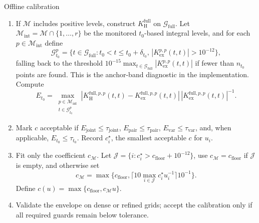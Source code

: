 \documentclass[11pt,a4paper]{article}
\theoremstyle{definition}
\theoremstyle{remark}
\begin{document}
\begin{tartarebox}{Offline calibration}
\begin{enumerate}[label=\textbf{O\arabic*.},leftmargin=1.8em,itemsep=4pt,topsep=2pt]
\[
E_{\mathrm{var}}=\max_j |K_{\mathrm H,jj}-K_{\mathrm{ex},jj}|\max\{|K_{\mathrm{ex},jj}|,\eta\}^{-1}.
\]
\item If \(\mathcal M\) includes positive levels, construct \(K_{\mathrm H}^{\mathrm{full}}\) on \(\mathcal G_{\mathrm{full}}\). Let \(\mathcal M_{\mathrm{int}}=\mathcal M\cap\{1,\ldots,r\}\) be the monitored \(t_0\)-based integral levels, and for each \(p\in\mathcal M_{\mathrm{int}}\) define
\[
\mathcal G_{t_0}^p=\{t\in\mathcal G_{\mathrm{full}}:t_0<t\leq t_0+\delta_{t_0},\, |K_{\mathrm{ex}}^{p,p}(t,t)|>10^{-12}\},
\]
falling back to the threshold \(10^{-15}\max_{t\in\mathcal G_{\mathrm{full}}}|K_{\mathrm{ex}}^{p,p}(t,t)|\) if fewer than \(n_{t_0}\) points are found. This is the anchor-band diagnostic in the implementation. Compute
\[
E_{t_0}=\max_{\substack{p\in\mathcal M_{\mathrm{int}}\\ t\in\mathcal G_{t_0}^p}} |K_{\mathrm H}^{\mathrm{full},p,p}(t,t)-K_{\mathrm{ex}}^{\mathrm{full},p,p}(t,t)|\,|K_{\mathrm{ex}}^{\mathrm{full},p,p}(t,t)|^{-1}.
\]
\item Mark \(c\) acceptable if \(E_{\mathrm{joint}}\leq\tau_{\mathrm{joint}}\), \(E_{\mathrm{pair}}\leq\tau_{\mathrm{pair}}\), \(E_{\mathrm{var}}\leq\tau_{\mathrm{var}}\), and, when applicable, \(E_{t_0}\leq\tau_{t_0}\). Record \(c_i^\star\), the smallest acceptable \(c\) for \(u_i\).
\item Fit only the coefficient \(c_{\mathcal M}\). Let \(\mathcal J=\{i:c_i^\star>c_{\mathrm{floor}}+10^{-12}\}\), use \(c_{\mathcal M}=c_{\mathrm{floor}}\) if \(\mathcal J\) is empty, and otherwise set
\[
c_{\mathcal M}=\max\{c_{\mathrm{floor}},\lceil10\max_{i\in\mathcal J}c_i^\star u_i^{-1}\rceil10^{-1}\}.
\]
Define \(c(u)=\max\{c_{\mathrm{floor}},c_{\mathcal M}u\}\).
\item Validate the envelope on dense or refined grids; accept the calibration only if all required guards remain below tolerance.
\end{enumerate}
\end{tartarebox}
\end{document}
